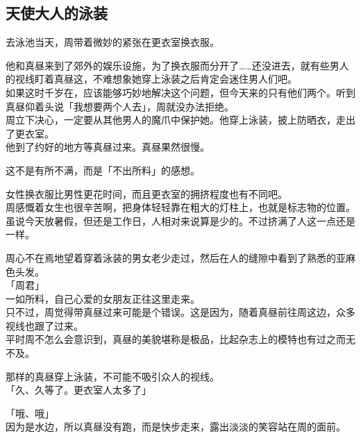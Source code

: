 \subsection{天使大人的泳装}

去泳池当天，周带着微妙的紧张在更衣室换衣服。

他和真昼来到了郊外的娱乐设施，为了换衣服而分开了……还没进去，就有些男人的视线盯着真昼这，不难想象她穿上泳装之后肯定会迷住男人们吧。\\

如果这时千岁在，应该能够巧妙地解决这个问题，但今天来的只有他们两个。听到真昼仰着头说「我想要两个人去」，周就没办法拒绝。\\

周立下决心，一定要从其他男人的魔爪中保护她。他穿上泳装，披上防晒衣，走出了更衣室。\\

他到了约好的地方等真昼过来。真昼果然很慢。

这不是有所不满，而是「不出所料」的感想。

女性换衣服比男性更花时间，而且更衣室的拥挤程度也有不同吧。\\

周感慨着女生也很辛苦啊，把身体轻轻靠在粗大的灯柱上，也就是标志物的位置。\\

虽说今天放暑假，但还是工作日，人相对来说算是少的。不过挤满了人这一点还是一样。

周心不在焉地望着穿着泳装的男女老少走过，然后在人的缝隙中看到了熟悉的亚麻色头发。\\

「周君」\\

一如所料，自己心爱的女朋友正往这里走来。\\

只不过，周觉得带真昼过来可能是个错误。这是因为，随着真昼前往周这边，众多视线也跟了过来。\\

平时周不怎么会意识到，真昼的美貌堪称是极品，比起杂志上的模特也有过之而无不及。

那样的真昼穿上泳装，不可能不吸引众人的视线。\\

「久、久等了。更衣室人太多了」

「哦、哦」\\

因为是水边，所以真昼没有跑，而是快步走来，露出淡淡的笑容站在周的面前。\\


